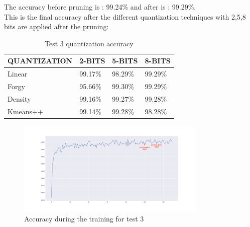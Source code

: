 \documentclass[journal]{vgtc}                %
\begin{document}
The accuracy before pruning is : 99.24\% and after is : 99.29\%.\\This is the final accuracy after the different quantization techniques with 2,5,8 bits are applied after the pruning:
\begin{table}[H]
\caption{Test 3 quantization accuracy}
\label{my-label}
\begin{tabular}{|l|l|l|l|}
\hline
QUANTIZATION & 2-BITS  & 5-BITS  & 8-BITS  \\ \hline
Linear       & 99.17\% & 98.29\% & 99.29\% \\ \hline
Forgy        & 95.66\% & 99.30\% & 99.29\% \\ \hline
Density       & 99.16\% & 99.27\% & 99.28\% \\ \hline
Kmeans++     & 99.14\% & 99.28\% & 98.28\% \\ \hline
\end{tabular}
\end{table}\begin{figure}[H]
	\hspace*{-1cm}
	\includegraphics[width=90mm,scale=0.7]{accuracy-soft-threshold-conv}
	\caption{Accuracy during the training for test 3}
\end{figure}
\end{document}
